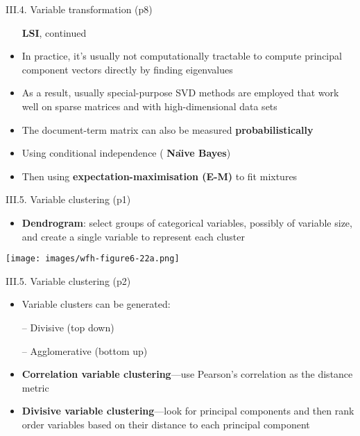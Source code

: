 \documentclass[handout]{beamer}
\newcommand{\strong}[1]{\textbf{\color{teal} #1}}
\newcommand{\stronger}[1]{\textbf{\color{purple} #1}}
\begin{document}
\begin{frame}{III.4. Variable transformation (p8)}
\begin{itemize}
\item[] \stronger{LSI}, continued
\item[]
\item In practice, it's usually not computationally tractable to compute principal component vectors directly by finding eigenvalues
\item As a result, usually special-purpose SVD methods are employed that work well on sparse matrices and with high-dimensional data sets
%
\item The document-term matrix can also be measured \strong{probabilistically}
\item Using conditional independence (\strong{Na\"{\i}ve Bayes})
\item Then using \strong{expectation-maximisation (E-M)} to fit mixtures
\end{itemize}
\end{frame}
\begin{frame}{III.5. Variable clustering (p1)}
\begin{itemize}
\item \stronger{Dendrogram}: select groups of categorical variables, possibly of variable size, and create a single variable to represent each cluster
\end{itemize}
\begin{center}
\texttt{[image: images/wfh-figure6-22a.png]}\\
\cite[Figure 6-22]{WFH3:2011}
\end{center}
\end{frame}
\begin{frame}{III.5. Variable clustering (p2)}
\begin{itemize}
\item Variable clusters can be generated:
\item[--] Divisive (top down)
\item[--] Agglomerative (bottom up)
\item[]
\item \stronger{Correlation variable clustering}---use Pearson's correlation as the distance metric
\item[]
\item \stronger{Divisive variable clustering}---look for principal components and then rank order variables based on their distance to each principal component
\end{itemize}
\end{frame}
\end{document}
